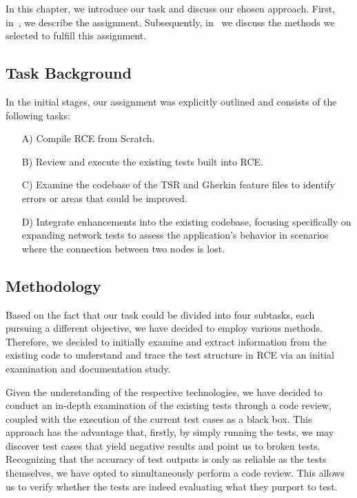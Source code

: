 \label{sec:method}
In this chapter, we introduce our task and discuss our chosen approach. First, in~, we describe the assignment. Subsequently, in~ we discuss the methods we selected to fulfill this assignment.

\subsection{Task Background}
\label{subsec:Task}
In the initial stages, our assignment was explicitly outlined and consists of the following tasks: 
\begin{enumerate}
    \item[A)] Compile \ac{RCE} from Scratch.
    \item[B)] Review and execute the existing tests built into \ac{RCE}.
    \item[C)] Examine the codebase of the \acl{TSR} and Gherkin feature files to identify errors or areas that could be improved.
    \item[D)] Integrate enhancements into the existing codebase, focusing specifically on expanding network tests to assess the application's behavior in scenarios where the connection between two nodes is lost.
\end{enumerate}

\subsection{Methodology}
\label{subsec:Methodologies}
Based on the fact that our task could be divided into four subtasks, each pursuing a different objective, we have decided to employ various methods. Therefore, we decided to initially examine and extract information from the existing code to understand and trace the test structure in \ac{RCE} via an initial examination and documentation study.

Given the understanding of the respective technologies, we have decided to conduct an in-depth examination of the existing tests through a code review, coupled with the execution of the current test cases as a black box. This approach has the advantage that, firstly, by simply running the tests, we may discover test cases that yield negative results and point us to broken tests. Recognizing that the accuracy of test outputs is only as reliable as the tests themselves, we have opted to simultaneously perform a code review. This allows us to verify whether the tests are indeed evaluating what they purport to test. 


